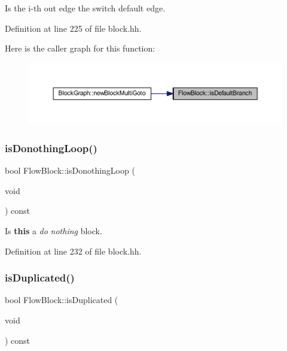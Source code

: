 Is the i-\/th out edge the switch default edge. 



Definition at line 225 of file block.\+hh.

Here is the caller graph for this function\+:
\nopagebreak
\begin{figure}[H]
\begin{center}
\leavevmode
\includegraphics[width=350pt]{class_flow_block_a597d04517618311c838f3c25bdbb02a9_icgraph}
\end{center}
\end{figure}
\mbox{\label{class_flow_block_a5489d98885f751ce20cf2badd93da3c7}} 
\subsubsection{\texorpdfstring{isDonothingLoop()}{isDonothingLoop()}}
{\footnotesize\ttfamily bool Flow\+Block\+::is\+Donothing\+Loop (\begin{DoxyParamCaption}\item[{void}]{ }\end{DoxyParamCaption}) const\hspace{0.3cm}{\ttfamily [inline]}}



Is {\bfseries{this}} a {\itshape do} {\itshape nothing} block. 



Definition at line 232 of file block.\+hh.

\mbox{\label{class_flow_block_a62d5d1a34bb6725a102a58f937c54930}} 
\subsubsection{\texorpdfstring{isDuplicated()}{isDuplicated()}}
{\footnotesize\ttfamily bool Flow\+Block\+::is\+Duplicated (\begin{DoxyParamCaption}\item[{void}]{ }\end{DoxyParamCaption}) const\hspace{0.3cm}{\ttfamily [inline]}}



